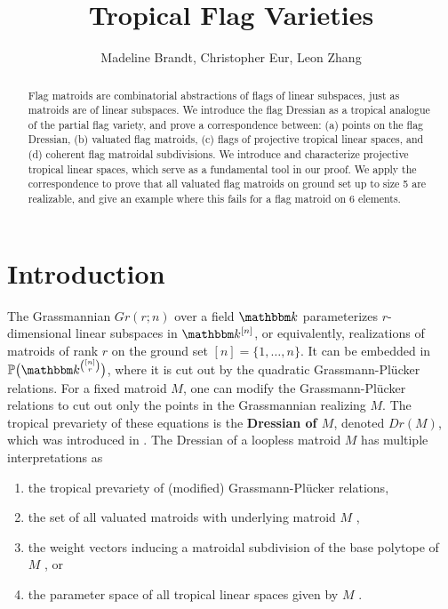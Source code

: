 \documentclass[11pt]{amsart}
\title{Tropical Flag Varieties}
\author{Madeline Brandt, Christopher Eur, Leon Zhang}
\newcommand{\kk}{\mathbbm k}
\theoremstyle{definition}
\begin{document}
\maketitle

\begin{abstract}
Flag matroids are combinatorial abstractions of flags of linear subspaces, just as matroids are of linear subspaces.  We introduce the flag Dressian as a tropical analogue of the partial flag variety, and prove a correspondence between: (a) points on the flag Dressian, (b) valuated flag matroids, (c) flags of projective tropical linear spaces, and (d) coherent flag matroidal subdivisions.
We introduce and characterize projective tropical linear spaces, which serve as a fundamental tool in our proof.  We apply the correspondence to prove that all valuated flag matroids on ground set up to size 5 are realizable, and give an example where this fails for a flag matroid on 6 elements.
\end{abstract}

\vspace{-2mm}
\section{Introduction}
\label{introduction}

The Grassmannian $Gr(r;n)$ over a field $\kk$ parameterizes $r$-dimensional linear subspaces in $\kk^{[n]}$, or equivalently, realizations of matroids of rank $r$ on the ground set $[n] = \{1,\ldots, n\}$.
It can be embedded in $\mathbb{P}\big(\kk^{\binom{[n]}{r}}\big)$, where it is cut out by the quadratic Grassmann-Pl\"{u}cker relations.
For a fixed matroid $M$, one can modify the Grassmann-Pl\"{u}cker relations to cut out only the points in the Grassmannian realizing $M$.
The tropical prevariety of these equations is the \textbf{Dressian of $M$}, denoted $Dr(M)$, which was introduced in \cite{tropplanes}.  The Dressian of a loopless matroid $M$ has multiple interpretations as
\begin{enumerate}[label = (\alph*)]
\item the tropical prevariety of (modified) Grassmann-Pl\"ucker relations,
\item the set of all valuated matroids with underlying matroid $M$ \cite{dress},
\item the weight vectors inducing a matroidal subdivision of the base polytope of $M$ \cite{speyer}, or
\item the parameter space of all tropical linear spaces given by $M$ \cite{speyer}.
\end{enumerate}
\end{document}

